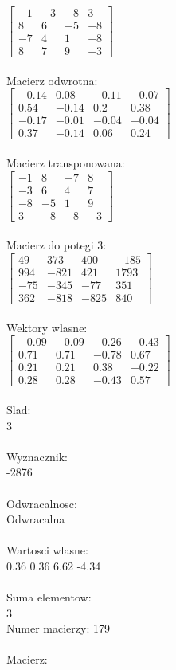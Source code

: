 \documentclass[a4paper,12pt]{article}
\begin{document}
$\begin{bmatrix} -1&-3&-8&3\\8&6&-5&-8\\-7&4&1&-8\\8&7&9&-3 \end{bmatrix}$
\\
\\
Macierz odwrotna:\\

$\begin{bmatrix} -0.14&0.08&-0.11&-0.07\\0.54&-0.14&0.2&0.38\\-0.17&-0.01&-0.04&-0.04\\0.37&-0.14&0.06&0.24 \end{bmatrix}$
\\
\\
Macierz transponowana:\\

$\begin{bmatrix} -1&8&-7&8\\-3&6&4&7\\-8&-5&1&9\\3&-8&-8&-3 \end{bmatrix}$
\\
\\
Macierz do potegi 3:\\

$\begin{bmatrix} 49&373&400&-185\\994&-821&421&1793\\-75&-345&-77&351\\362&-818&-825&840 \end{bmatrix}$
\\
\\
Wektory wlasne:\\

$\begin{bmatrix} -0.09&-0.09&-0.26&-0.43\\0.71&0.71&-0.78&0.67\\0.21&0.21&0.38&-0.22\\0.28&0.28&-0.43&0.57 \end{bmatrix}$
\\
\\
Slad:\\
3
\\
\\
Wyznacznik:\\
-2876
\\
\\
Odwracalnosc:\\
Odwracalna
\\
\\
Wartosci wlasne:\\
0.36 0.36 6.62 -4.34
\\
\\
Suma elementow:\\
3
\\
\newpage
Numer macierzy:
179
\\
\\
Macierz:\\
\end{document}
